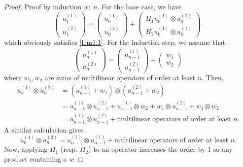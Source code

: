 \documentclass[a4paper, 12pt]{article}
\begin{document}
\begin{proof}
	Proof by induction on $n$.
	For the base case, we have
	\[
	\begin{pmatrix} u_{1}^{(1)}\\u_{1}^{(2)} \end{pmatrix} = \begin{pmatrix} u_0^{(1)}\\u_0^{(2)} \end{pmatrix} +
	\begin{pmatrix}
		H_1 u_0^{(1)} \otimes u_0^{(2)}\\
		H_2 u_0^{(1)} \otimes u_0^{(1)}
\end{pmatrix}
	.\]
	which obviously satisfies \cref{lem1:1}.
	For the induction step, we assume that
\[
		\begin{pmatrix} u_{n}^{(1)}\\u_n^{(2)} \end{pmatrix} = \begin{pmatrix} u_{n-1}^{(1)}\\u_{n-1}^{(2)} \end{pmatrix} +  \begin{pmatrix} w_1\\w_2 \end{pmatrix}
\]
where $w_1,w_2$ are sums of multilinear operators of order at least $n$.
Then,
\begin{align*}
u_n^{(1)} \otimes u_n^{(2)}
&=\left( u_{n-1}^{(1)} + w_1 \right) \otimes \left( u_{n-1}^{(2)}+ w_2 \right)\\
&=u_{n-1}^{(1)} \otimes u_{n-1}^{(2)} + u_{n-1}^{(1)} \otimes w_2 + w_1\otimes u_{n-1}^{(2)} + w_1\otimes w_2 \\
&= u_{n-1}^{(1)}\otimes u_{n-1}^{(2)} + \text{multilinear operators of order at least $n$}
.\end{align*}
A similar calculation gives
\[
u_n^{(1)} \otimes u_n^{(2)}
= u_{n-1}^{(1)}\otimes u_{n-1}^{(1)} + \text{multilinear operators of order at least $n$}
.\]
Now, applying $H_1$ (resp. $H_2$) to an operator increases the order by 1 so any product containing a $w$


\end{proof}
\end{document}
